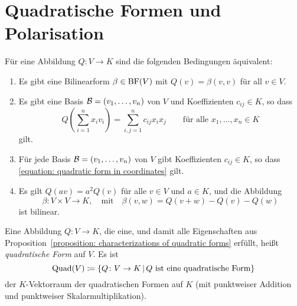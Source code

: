 \section{Quadratische Formen und Polarisation}

\begin{proposition}
  \label{proposition: characterizations of quadratic forms}
  Für eine Abbildung $Q \colon V \to K$ sind die folgenden Bedingungen äquivalent:
  \begin{enumerate}
    \item
      Es gibt eine Bilinearform $\beta \in \operatorname{BF}(V)$ mit $Q(v) = \beta(v, v)$ für all $v \in V$.
    \item
      Es gibt eine Basis $\mathcal{B} = (v_1, \dotsc, v_n)$ von $V$ und Koeffizienten $c_{ij} \in K$, so dass
      \begin{equation}
        \label{equation: quadratic form in coordinates}
          Q\left( \sum_{i=1}^n x_i v_i \right)
        = \sum_{i,j=1}^n c_{ij} x_i x_j
        \qquad
        \text{für alle $x_1, \dotsc, x_n \in K$}
      \end{equation}
      gilt.
    \item
      Für jede Basis $\mathcal{B} = (v_1, \dotsc, v_n)$ von $V$ gibt Koeffizienten $c_{ij} \in K$, so dass \eqref{equation: quadratic form in coordinates} gilt.
    \item
      Es gilt $Q(av) = a^2 Q(v)$ für alle $v \in V$ und $a \in K$, und die Abbildung
      \[
                \beta
        \colon  V \times V
        \to     K,
        \quad\text{mit}\quad
          \beta(v,w)
        = Q(v + w) - Q(v) - Q(w)
      \]
      ist bilinear.
  \end{enumerate}
\end{proposition}

\begin{definition}
  Eine Abbildung $Q \colon V \to K$, die eine, und damit alle Eigenschaften aus Proposition~\ref{proposition: characterizations of quadratic forms} erfüllt, heißt \emph{quadratische Form} auf $V$.
  Es ist
  \[
              \operatorname{Quad}(V)
    \coloneqq \{ Q \colon V \to K \,|\, \text{$Q$ ist eine quadratische Form} \}
  \]
  der $K$-Vektorraum der quadratischen Formen auf $K$ (mit punktweiser Addition und punktweiser Skalarmultiplikation).
\end{definition}

